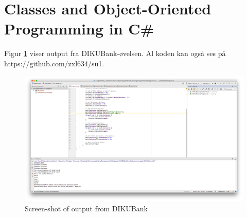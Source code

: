 \section{Classes and Object-Oriented Programming in C\#}
Figur \ref{fig:rider3} viser output fra DIKUBank-øvelsen. Al koden kan også ses på https://github.com/zxl634/su1.
\begin{figure}[ht]
  \centering
  \includegraphics[width=1\linewidth]{rider3}
  \caption{Screen-shot of output from DIKUBank}
  \label{fig:rider3}
\end{figure}
